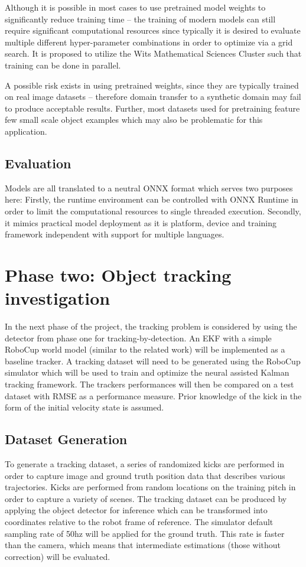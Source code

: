 \documentclass[a4paper,twoside,12pt]{report}
\begin{document}
Although it is possible in most cases to use pretrained model weights to significantly reduce training time -- the training of modern models can still require significant computational resources since typically it is desired to evaluate multiple different hyper-parameter combinations in order to optimize via a grid search. It is proposed to utilize the Wits Mathematical Sciences Cluster such that training can be done in parallel.  

A possible risk exists in using pretrained weights, since they are typically trained on real image datasets -- therefore domain transfer to a synthetic domain may fail to produce acceptable results. Further, most datasets used for pretraining feature few small scale object examples which may also be problematic for this application.

\subsection{Evaluation}
Models are all translated to a neutral ONNX format which serves two purposes here: Firstly, the runtime environment can be controlled with ONNX Runtime in order to limit the computational resources to single threaded execution. Secondly, it mimics practical model deployment as it is platform, device and training framework independent with support for multiple languages. 

\section{Phase two: Object tracking investigation}

In the next phase of the project, the tracking problem is considered by using the detector from phase one for tracking-by-detection. An EKF with a simple RoboCup world model (similar to the related work) will be implemented as a baseline tracker. A tracking dataset will need to be generated using the RoboCup simulator which will be used to train and optimize the neural assisted Kalman tracking framework. The trackers performances will then be compared on a test dataset with RMSE as a performance measure. Prior knowledge of the kick in the form of the initial velocity state is assumed.

\subsection{Dataset Generation}

To generate a tracking dataset, a series of randomized kicks are performed in order to capture image and ground truth position data that describes various trajectories. Kicks are performed from random locations on the training pitch in order to capture a variety of scenes. The tracking dataset can be produced by applying the object detector for inference which can be transformed into coordinates relative to the robot frame of reference. The simulator default sampling rate of 50hz will be applied for the ground truth. This rate is faster than the camera, which means that intermediate estimations (those without correction) will be evaluated.
\end{document}
